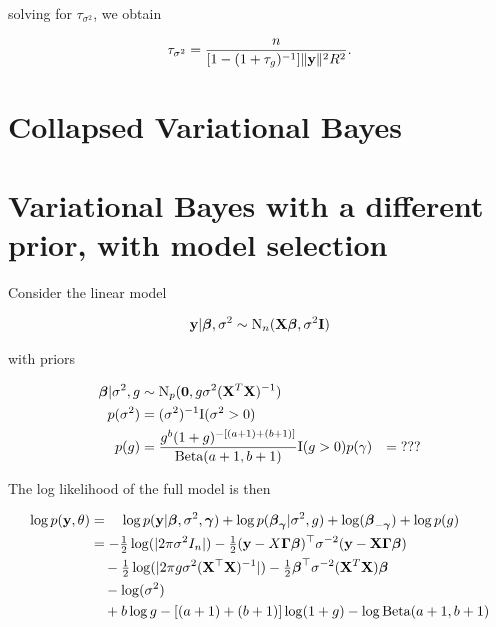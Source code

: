 \documentclass{amsart}[12pt]
\begin{document}
solving for $\tau_{\sigma^2}$, we obtain

\begin{align*}
\tau_{\sigma^2} = \frac{n}{[1 - (1 + \tau_g)^{-1}]\|{\bf y}\|^2 R^2}.
\end{align*}

\section{Collapsed Variational Bayes}


\section{Variational Bayes with a different prior, with model selection}

Consider the linear model

\begin{align*}
{\bf y} | {\boldsymbol \beta}, \sigma^2 \sim \text{N}_n({\bf X} {\boldsymbol \beta}, \sigma^2 {\bf I})
\end{align*}

with priors

\begin{align*}
{\boldsymbol\beta} | \sigma^2, g &\sim \text{N}_p({\bf 0}, g \sigma^2 ({\bf X}^T {\bf X})^{-1}) \\
p(\sigma^2) &= (\sigma^2)^{-1} \text{I}(\sigma^2 > 0) \\
p(g) &= \frac{g^b (1 + g)^{-[(a + 1) + (b + 1)]}}{\text{Beta} (a + 1, b + 1)} \text{I}(g > 0)
p(\gamma) &= \text{???}
\end{align*}

The log likelihood of the full model is then

\begin{align*}
\log p({\bf y}, \theta) &= \quad\log p({\bf y}|{\boldsymbol \beta}, \sigma^2, {\boldsymbol \gamma}) + \log p({\boldsymbol \beta}_{\boldsymbol \gamma} | \sigma^2, g) + \log({\boldsymbol \beta}_{-{\boldsymbol \gamma}}) + \log p(g) \\
&= -\tfrac{1}{2} \log(|2 \pi \sigma^2 I_n|) - \tfrac{1}{2} ({\bf y} - X {\boldsymbol \Gamma} {\boldsymbol \beta})^\top \sigma^{-2} ({\bf y} - {\bf X} {\boldsymbol \Gamma} {\boldsymbol \beta}) \\
&\quad -\tfrac{1}{2} \log(|2 \pi g \sigma^2 ({\bf X}^\top {\bf X})^{-1}|) -\tfrac{1}{2} {\boldsymbol \beta}^\top \sigma^{-2} ({\bf X}^T {\bf X}) {\boldsymbol \beta} \\
&\quad - \log (\sigma^2) \\
&\quad + b \log g - [(a + 1) + (b + 1)] \log (1 + g) - \log \text{Beta} (a + 1, b + 1)
\end{align*}
\end{document}
